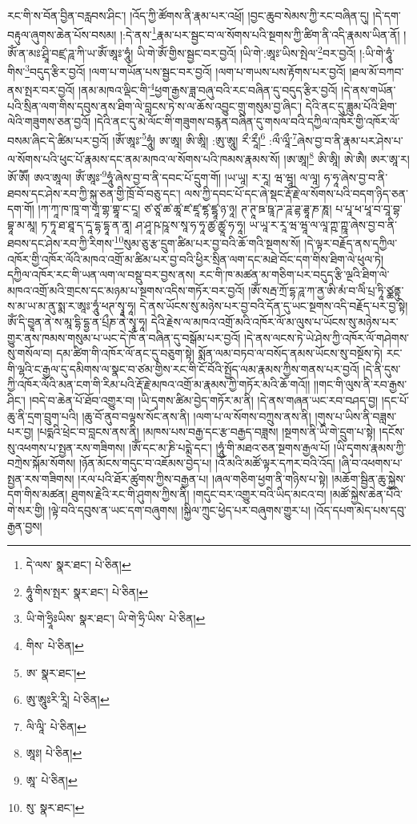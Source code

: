 རང་གི་ས་བོན་བྱིན་བརླབས་ཤིང་། །འོད་ཀྱི་ཚོགས་ནི་རྣམ་པར་འཕྲོ། །བྱང་ཆུབ་སེམས་ཀྱི་རང་བཞིན་དུ། །དེ་དག་བརྟུལ་ཞུགས་ཆེན་པོས་བསམ། །:དེ་ནས་\footnote{དེ་ལས་  སྣར་ཐང་།  པེ་ཅིན། }རྣམ་པར་སྦྱང་བ་ལ་སོགས་པའི་སྔགས་ཀྱི་ཚིག་ནི་འདི་རྣམས་ཡིན་ནོ། །ཨོཾ་ན་མཿ་ཤྲཱི་བཛྲ་ཌཱ་ཀི་ཡ་ཨོཾ་ཨཱཿ་ཧཱུཾ། ཡི་གེ་ཨོཾ་གྱིས་སྦྱང་བར་བྱའོ། །ཡི་གེ་:ཨཱཿ་ཡིས་སྤེལ་\footnote{ཧཱུཾ་གིས་སྤར་  སྣར་ཐང་།  པེ་ཅིན། }བར་བྱའོ། །:ཡི་གེ་ཧཱུཾ་གིས་\footnote{ཡི་གེ་ཧྲཱིཿཡིས་  སྣར་ཐང་། ཡི་གེ་ཧྲི་ཡིས་  པེ་ཅིན། }བདུད་རྩིར་བྱའོ། །ལག་པ་གཡོན་པས་སྦྱང་བར་བྱའོ། །ལག་པ་གཡས་པས་རྟོགས་པར་བྱའོ། །ཐལ་མོ་བཀབ་ནས་སྤར་བར་བྱའོ། །ནམ་མཁའ་ལྡིང་གི་\footnote{གིས་  པེ་ཅིན། }ཕྱག་རྒྱས་ཟླ་བཞུ་བའི་རང་བཞིན་དུ་བདུད་རྩིར་བྱའོ། །དེ་ནས་གཡོན་པའི་སྲིན་ལག་གིས་དབུས་ནས་ཐིག་ལེ་བླངས་ཏེ་ས་ལ་ཆོས་འབྱུང་གྲུ་གསུམ་བྱ་ཞིང་། དེའི་ནང་དུ་ཟླུམ་པོའི་ཐིག་ལེའི་གཟུགས་ཅན་བྱའོ། །དེའི་ནང་དུ་མེ་ལོང་གི་གཟུགས་བརྙན་བཞིན་དུ་གསལ་བའི་དཀྱིལ་འཁོར་གྱི་འཁོར་ལོ་བསམ་ཞིང་དེ་ཚིམ་པར་བྱའོ། །ཨོཾ་ཨཱཿ་\footnote{ཨ་  སྣར་ཐང་། }ཧཱུཾ། ཨ་ཨཱ། ཨི་ཨཱི། :ཨུ་ཨཱུ། རྀ་རཱྀ།\footnote{ཨུ་ཨཱུཿརི་རཱི།  པེ་ཅིན། } :ལྀ་ལཱྀ་\footnote{ལི་ལཱི་  པེ་ཅིན། }ཞེས་བྱ་བ་ནི་རྣམ་པར་ཤེས་པ་ལ་སོགས་པའི་ཕུང་པོ་རྣམས་དང་ནམ་མཁའ་ལ་སོགས་པའི་ཁམས་རྣམས་སོ། །ཨ་ཨཱ།\footnote{ཨཱཿ།  པེ་ཅིན། } ཨི་ཨཱི། ཨེ་ཨཻ། ཨར་ཨཱ་ར། ཨོ་ཨཽ། ཨའ་ཨཱལ། ཨོཾ་ཨཱཿ་\footnote{ཨཱ་  པེ་ཅིན། }ཧཱུཾ་ཞེས་བྱ་བ་ནི་དབང་པོ་དྲུག་གོ། །ཡ་ཡཱ། ར་རཱ། ཝ་ཝཱ། ལ་ལཱ། ཧ་ཧཱ་ཞེས་བྱ་བ་ནི་ཐབས་དང་ཤེས་རབ་ཀྱི་སྐུ་ཅན་གྱི་ཁྲོ་བོ་བཅུ་དང་། ལས་ཀྱི་དབང་པོ་དང་ཞེ་སྡང་རྡོ་རྗེ་ལ་སོགས་པའི་བདག་ཉིད་ཅན་དག་གོ། །ཀ་ཀཱ་ཁ་ཁཱ་ག་གཱ་གྷ་གྷཱ་ང་ངཱ། ཙ་ཙཱ་ཚ་ཚཱ་ཛ་ཛཱ་ཛྷ་ཛྷཱ་ཉ་ཉཱ། ཊ་ཊཱ་ཋ་ཋཱ་ཌ་ཌཱ་ཌྷ་ཌྷཱ་ཎ་ཎཱ། པ་པཱ་ཕ་ཕཱ་བ་བཱ་བྷ་བྷཱ་མ་མཱ། ཏ་ཏཱ་ཐ་ཐཱ་ད་དཱ་དྷ་དྷཱ་ན་ནཱ། ཤ་ཤཱ་ཥ་ཥཱ་ས་སཱ་ཧ་ཧཱ་ཚྱ་ཚྱཱ་ཧ་ཧཱ། ཡ་ཡཱ་ར་རཱ་ཝ་ཝཱ་ལ་ལཱ་ཀྵ་ཀྵཱ་ཞེས་བྱ་བ་ནི་ཐབས་དང་ཤེས་རབ་ཀྱི་རིགས་\footnote{སུ་  སྣར་ཐང་། }སུམ་ཅུ་རྩ་དྲུག་ཚིམ་པར་བྱ་བའི་ཆོ་གའི་སྔགས་སོ། །དེ་ལྟར་བརྗོད་ནས་དཀྱིལ་འཁོར་གྱི་འཁོར་ལོའི་མཁའ་འགྲོ་མ་ཚིམ་པར་བྱ་བའི་ཕྱིར་སྲིན་ལག་དང་མཐེ་བོང་དག་གིས་ཐིག་ལེ་ཕུལ་ཏེ། དཀྱིལ་འཁོར་རང་གི་ཡན་ལག་ལ་བསྡུ་བར་བྱས་ནས། རང་གི་ཁ་མཚན་མ་གཅིག་པར་བདུད་རྩི་ལྔའི་ཐིག་ལེ་མཁའ་འགྲོ་མའི་གྲངས་དང་མཉམ་པ་སྔགས་འདིས་གཏོར་བར་བྱའོ། །ཨོཾ་སརྦ་ཀྲོ་དྷ་ཌཱ་ཀ་ནྱ་ཨི་མཾ་བ་ལིཾ་པྲ་ཏཱི་ཙྪནྟུ་ས་མ་ཡ་མ་ནུ་སྨ་ར་ཨཱཿ་ཧཱུཾ་ཕཊ་སྭཱ་ཧཱ། དེ་ནས་ཡོངས་སུ་མཉེས་པར་བྱ་བའི་དོན་དུ་ཡང་སྔགས་འདི་བརྗོད་པར་བྱ་སྟེ། ཨོཾ་དི་བྱཱན་ནེ་ས་མཱ་དྷི་དྷྱ་ན་པྲྀཎ་ནེ་སྭཱ་ཧཱ། དེའི་རྗེས་ལ་མཁའ་འགྲོ་མའི་འཁོར་ལོ་མ་ལུས་པ་ཡོངས་སུ་མཉེས་པར་གྱུར་ནས་ཁམས་གསུམ་པ་ཡང་དེ་ཁོ་ན་བཞིན་དུ་བསྒོམ་པར་བྱའོ། །དེ་ནས་ལངས་ཏེ་ཡེ་ཤེས་ཀྱི་འཁོར་ལོ་གཤེགས་སུ་གསོལ་བ། དམ་ཚིག་གི་འཁོར་ལོ་ནང་དུ་བཅུག་སྟེ། སྨོན་ལམ་བཏབ་ལ་བསོད་ནམས་ཡོངས་སུ་བསྔོས་ཏེ། རང་གི་ལྷའི་ང་རྒྱལ་དུ་དམིགས་ལ་སྣང་བ་ཙམ་གྱིས་རང་གི་ངོ་བོའི་སྤྱོད་ལམ་རྣམས་ཀྱིས་གནས་པར་བྱའོ། །དེ་ནི་དུས་ཀྱི་འཁོར་ལོའི་མན་ངག་གི་རིམ་པའི་རྡོ་རྗེ་མཁའ་འགྲོ་མ་རྣམས་ཀྱི་གཏོར་མའི་ཆོ་གའོ།། །།གང་གི་ལུས་ནི་རབ་རྒྱས་ཤིང་། །བདེ་བ་ཆེན་པོ་ཐོབ་འགྱུར་བ། །ཡི་དྭགས་ཚིམ་བྱེད་གཏོར་མ་ནི། །དེ་ནས་གཞན་ཡང་རབ་བཤད་བྱ། །དང་པོ་ཆུ་ནི་དྲག་བྲུག་པའི། །ཆུ་བོ་ནུབ་བལྟས་སོང་ནས་ནི། །ལག་པ་ལ་སོགས་བཀྲུས་ནས་ནི། །གུས་པ་ཡིས་ནི་བཟླས་པར་བྱ། །པདྨའི་ཕྲེང་བ་བླངས་ནས་ནི། །མཁས་པས་བརྒྱ་དང་རྩ་བརྒྱད་བཟླས། །སྔགས་ནི་ཡི་གེ་དྲུག་པ་སྟེ། །དངོས་སུ་འཕགས་པ་སྤྱན་རས་གཟིགས། །ཨོཾ་དང་མ་ཎི་པདྨེ་དང་། །ཧཱུཾ་གི་མཐའ་ཅན་སྔགས་རྒྱལ་པོ། །ཡི་དྭགས་རྣམས་ཀྱི་བཀྲེས་སྐོམ་སོགས། །ཉོན་མོངས་གདུང་བ་འཇོམས་བྱེད་པ། །འོ་མའི་མཚོ་ལྟར་དཀར་བའི་འོད། །ཞི་བ་འཕགས་པ་སྤྱན་རས་གཟིགས། །རལ་པའི་ཐོར་ཚུགས་ཀྱིས་བརྒྱན་པ། །ཞལ་གཅིག་ཕྱག་ནི་གཉིས་པ་སྟེ། །མཆོག་སྦྱིན་ཆུ་སྐྱེས་དག་གིས་མཚན། ཐུགས་རྗེའི་རང་གི་ཤུགས་ཀྱིས་ནི། །གདུང་བར་འགྱུར་བའི་ཡིད་མངའ་བ། །མཚོ་སྐྱེས་ཆེན་པོའི་གེ་སར་གྱི། །ལྟེ་བའི་དབུས་ན་ཡང་དག་བཞུགས། །སྐྱིལ་ཀྲུང་ཕྱེད་པར་བཞུགས་གྱུར་པ། །འོད་དཔག་མེད་པས་དབུ་རྒྱན་བྱས། 